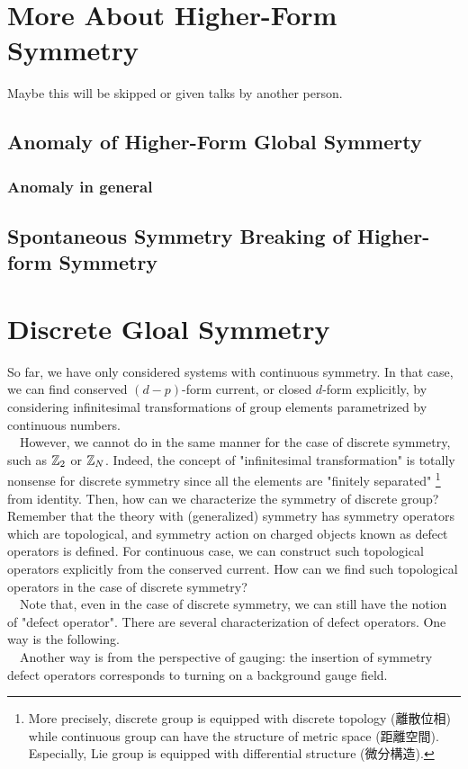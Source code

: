 \documentclass{ltjsarticle}
\theoremstyle{mystyle} %
\numberwithin{equation}{section}
\begin{document}
\section{More About Higher-Form Symmetry}
\small
Maybe this will be skipped or given talks by another person. 
\subsection{Anomaly of Higher-Form Global Symmerty}
\subsubsection{Anomaly in general}
\subsection{Spontaneous Symmetry Breaking of Higher-form Symmetry}
\newpage
\section{Discrete Gloal Symmetry}
So far, we have only considered systems with continuous symmetry. 
In that case, we can find conserved $(d-p)$-form current, or closed $d$-form explicitly, 
by considering infinitesimal transformations of group elements parametrized by continuous numbers. \\
　However, we cannot do in the same manner for the case of discrete symmetry, 
such as $\mathbb{Z}_2$ or $\mathbb{Z}_N$. 
Indeed, the concept of "infinitesimal transformation" is totally nonsense for discrete symmetry 
since all the elements are "finitely separated"
\footnote{
    More precisely, 
    discrete group is equipped with discrete topology (離散位相) while 
    continuous group can have the structure of metric space (距離空間). 
    Especially, Lie group is equipped with differential structure (微分構造). 
} from identity. 
Then, how can we characterize the symmetry of discrete group? 
Remember that the theory with (generalized) symmetry has symmetry operators which are topological, 
and symmetry action on charged objects known as defect operators is defined. 
For continuous case, we can construct such topological operators explicitly from the conserved current. 
How can we find such topological operators in the case of discrete symmetry? \\
　Note that, even in the case of discrete symmetry, 
we can still have the notion of "defect operator". 
There are several characterization of defect operators. 
One way is the following. \\
　Another way is from the perspective of gauging: the insertion of symmetry defect operators corresponds to turning on a background gauge field. 
\end{document}
